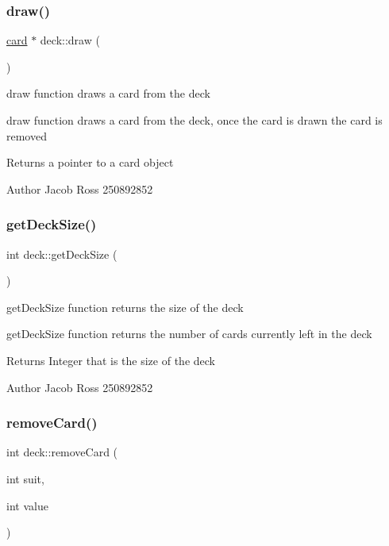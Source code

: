 \subsubsection{\texorpdfstring{draw()}{draw()}}
{\footnotesize\ttfamily \hyperlink{classcard}{card} $\ast$ deck\+::draw (\begin{DoxyParamCaption}{ }\end{DoxyParamCaption})}



draw function draws a card from the deck 

draw function draws a card from the deck, once the card is drawn the card is removed \begin{DoxyReturn}{Returns}
a pointer to a card object 
\end{DoxyReturn}
\begin{DoxyAuthor}{Author}
Jacob Ross 250892852 
\end{DoxyAuthor}
\mbox{\label{classdeck_ada0bdbb4dcd27f39db797925ac0c11ce}} 
\subsubsection{\texorpdfstring{get\+Deck\+Size()}{getDeckSize()}}
{\footnotesize\ttfamily int deck\+::get\+Deck\+Size (\begin{DoxyParamCaption}{ }\end{DoxyParamCaption})}



get\+Deck\+Size function returns the size of the deck 

get\+Deck\+Size function returns the number of cards currently left in the deck \begin{DoxyReturn}{Returns}
Integer that is the size of the deck 
\end{DoxyReturn}
\begin{DoxyAuthor}{Author}
Jacob Ross 250892852 
\end{DoxyAuthor}
\mbox{\label{classdeck_a4c60464da694301c1b7b4275bae0b384}} 
\subsubsection{\texorpdfstring{remove\+Card()}{removeCard()}}
{\footnotesize\ttfamily int deck\+::remove\+Card (\begin{DoxyParamCaption}\item[{int}]{suit,  }\item[{int}]{value }\end{DoxyParamCaption})}



